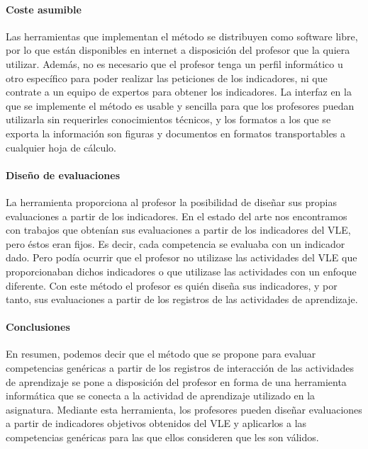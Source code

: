 \paragraph*{Coste asumible}

Las herramientas que implementan el método se distribuyen como software libre, por lo que están disponibles en internet a disposición del profesor que la quiera utilizar. Además, no es necesario que el profesor tenga un perfil informático u otro específico para poder realizar las peticiones de los indicadores, ni que contrate a un equipo de expertos para obtener los indicadores. La interfaz en la que se implemente el método es usable y sencilla para que los profesores puedan utilizarla sin requerirles conocimientos técnicos, y los formatos a los que se exporta la información son figuras y documentos en formatos transportables a cualquier hoja de cálculo.

\paragraph*{Diseño de evaluaciones}

La herramienta proporciona al profesor la posibilidad de diseñar sus propias evaluaciones a partir de los indicadores. En el estado del arte nos encontramos con trabajos que obtenían sus evaluaciones a partir de los indicadores del VLE, pero éstos eran fijos. Es decir, cada competencia se evaluaba con un indicador dado. Pero podía ocurrir que el profesor no utilizase las actividades del VLE que proporcionaban dichos indicadores o que utilizase las actividades con un enfoque diferente. Con este método el profesor es quién diseña sus indicadores, y por tanto, sus evaluaciones a partir de los registros de las actividades de aprendizaje.

\paragraph*{Conclusiones}

En resumen, podemos decir que el método que se propone para evaluar competencias genéricas a partir de los registros de interacción de las actividades de aprendizaje se pone a disposición del profesor en forma de una herramienta informática que se conecta a la actividad de aprendizaje utilizado en la asignatura. Mediante esta herramienta, los profesores pueden diseñar evaluaciones a partir de indicadores objetivos obtenidos del VLE y aplicarlos a las competencias genéricas para las que ellos consideren que les son válidos.


